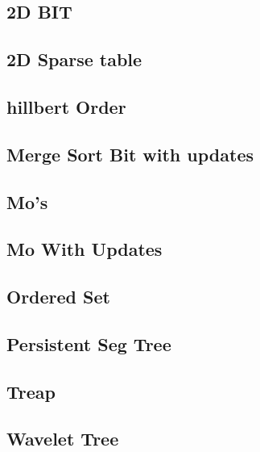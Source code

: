 \subsection{2D BIT}
\raggedbottom
\hrulefill
\subsection{2D Sparse table}
\raggedbottom
\hrulefill
\subsection{hillbert Order}
\raggedbottom
\hrulefill
\subsection{Merge Sort Bit with updates}
\raggedbottom
\hrulefill
\subsection{Mo's}
\raggedbottom
\hrulefill
\subsection{Mo With Updates}
\raggedbottom
\hrulefill
\subsection{Ordered Set}
\raggedbottom
\hrulefill
\subsection{Persistent Seg Tree}
\raggedbottom
\hrulefill
\subsection{Treap}
\raggedbottom
\hrulefill
\subsection{Wavelet Tree}
\raggedbottom
\hrulefill
